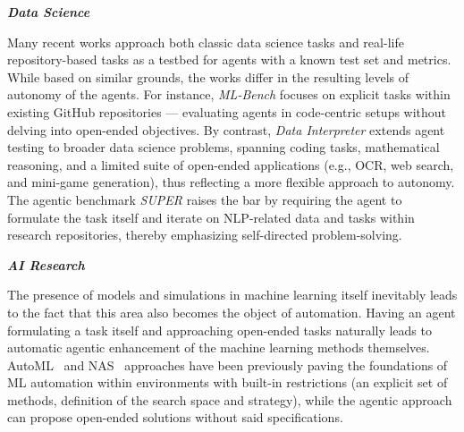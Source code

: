 \documentclass[]{fairmeta}
\newcommand{\ibold}[1]{\textbf{\textit{#1}}}
\begin{document}
\ibold{Data Science}

Many recent works approach both classic data science tasks and real-life repository-based tasks as a testbed for agents with a known test set and metrics.
While based on similar grounds, the works differ in the resulting levels of autonomy of the agents. For instance, \textit{ML-Bench} \citep{tangMLBenchEvaluatingLarge2024} focuses on explicit tasks within existing GitHub repositories — evaluating agents in code-centric setups without delving into open-ended objectives. By contrast, \textit{Data Interpreter} \citep{hongDataInterpreterLLM2024} extends agent testing to broader data science problems, spanning coding tasks, mathematical reasoning, and a limited suite of open-ended applications (e.g., OCR, web search, and mini-game generation), thus reflecting a more flexible approach to autonomy. The agentic benchmark \textit{SUPER} \citep{boginSUPEREvaluatingAgents2024} raises the bar by requiring the agent to formulate the task itself and iterate on NLP-related data and tasks within research repositories, thereby emphasizing self-directed problem-solving.


\ibold{AI Research}

The presence of models and simulations in machine learning itself inevitably leads to the fact that this area also becomes the object of automation.
Having an agent formulating a task itself and approaching open-ended tasks naturally leads to automatic agentic enhancement of the machine learning methods themselves. AutoML~\citep{eggensperger2019pitfalls,lindauer2020best,tornede2023automl} and NAS~\citep{elsken2019neural,nasir2024llmatic} approaches have been previously paving the foundations of ML automation within environments with built-in restrictions (an explicit set of methods, definition of the search space and strategy), while the agentic approach can propose open-ended solutions without said specifications.
\end{document}
